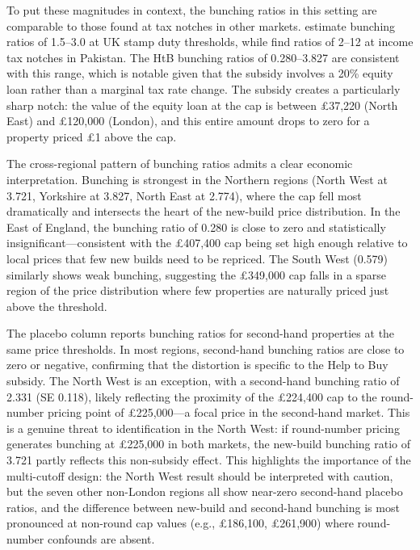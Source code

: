 \documentclass[12pt]{article}
\begin{document}
To put these magnitudes in context, the bunching ratios in this setting are comparable to those found at tax notches in other markets. \citet{best2018housing} estimate bunching ratios of 1.5--3.0 at UK stamp duty thresholds, while \citet{kleven2013using} find ratios of 2--12 at income tax notches in Pakistan. The HtB bunching ratios of 0.280--3.827 are consistent with this range, which is notable given that the subsidy involves a 20\% equity loan rather than a marginal tax rate change. The subsidy creates a particularly sharp notch: the value of the equity loan at the cap is between \pounds37,220 (North East) and \pounds120,000 (London), and this entire amount drops to zero for a property priced \pounds1 above the cap.

The cross-regional pattern of bunching ratios admits a clear economic interpretation. Bunching is strongest in the Northern regions (North West at 3.721, Yorkshire at 3.827, North East at 2.774), where the cap fell most dramatically and intersects the heart of the new-build price distribution. In the East of England, the bunching ratio of 0.280 is close to zero and statistically insignificant---consistent with the \pounds407,400 cap being set high enough relative to local prices that few new builds need to be repriced. The South West (0.579) similarly shows weak bunching, suggesting the \pounds349,000 cap falls in a sparse region of the price distribution where few properties are naturally priced just above the threshold.

The placebo column reports bunching ratios for second-hand properties at the same price thresholds. In most regions, second-hand bunching ratios are close to zero or negative, confirming that the distortion is specific to the Help to Buy subsidy. The North West is an exception, with a second-hand bunching ratio of 2.331 (SE 0.118), likely reflecting the proximity of the \pounds224,400 cap to the round-number pricing point of \pounds225,000---a focal price in the second-hand market. This is a genuine threat to identification in the North West: if round-number pricing generates bunching at £225,000 in both markets, the new-build bunching ratio of 3.721 partly reflects this non-subsidy effect. This highlights the importance of the multi-cutoff design: the North West result should be interpreted with caution, but the seven other non-London regions all show near-zero second-hand placebo ratios, and the difference between new-build and second-hand bunching is most pronounced at non-round cap values (e.g., \pounds186,100, \pounds261,900) where round-number confounds are absent.
\end{document}
